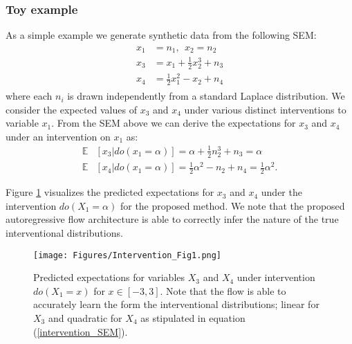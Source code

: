 \documentclass{article}
\begin{document}
\subsubsection*{Toy example}
As a simple example we generate synthetic data from the following SEM:
\begin{align}
\begin{split}
\label{intervention_SEM}
x_1&= n_1, ~~ x_2 = n_2\\
x_3 &= x_1 + \frac{1}{2} x_2^3 + n_3\\
x_4 &= \frac{1}{2} x_1^2 - x_2 + n_4
\end{split}
\end{align}
where each $n_i$ is drawn independently from a standard Laplace distribution. 
We consider the expected values of $x_3$ and $x_4$ under various distinct 
interventions to variable $x_1$. 
From the SEM above we can derive the  expectations for $x_3$ and $x_4$ under
an intervention on $x_1$ as:
\begin{align*}
\mathbb{E}&[x_3 | do(x_1=\alpha)] = \alpha +\frac{1}{2} n_2^3 + n_3 = \alpha \\
\mathbb{E}&[x_4 | do(x_1=\alpha)] =  \frac{1}{2} \alpha^2 -n_2 + n_4 =  \frac{1}{2} \alpha^2 .
\end{align*}

Figure \ref{Fig:interventionExample1} visualizes the predicted expectations for $x_3$ and $x_4$ under
the intervention $do( X_1=\alpha)$ for the proposed method. We note that 
the proposed autoregressive flow architecture is able to correctly infer the nature of 
the true interventional distributions. 



\begin{figure}[t!]
	\vskip 0.2in
	\begin{center}
		\centerline{\texttt{[image: Figures/Intervention\_Fig1.png]}}
		\caption{Predicted expectations for variables $X_3$ and $X_4$ under intervention $do(X_1=x)$ for $x\in [-3, 3]$. Note that the
			flow is able to accurately learn the form the interventional distributions; linear for $X_3$ and
			quadratic for $X_4$ as stipulated in equation (\ref{intervention_SEM}).   }
		\label{Fig:interventionExample1}
	\end{center}
	\vskip -0.2in
\end{figure}
\end{document}
